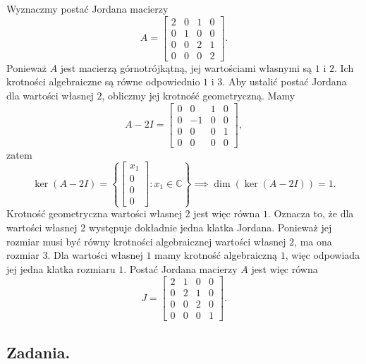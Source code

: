 \begin{example}
	Wyznaczmy postać Jordana macierzy
	\begin{equation}
		A = \left[\begin{matrix}
			2 & 0 & 1 & 0 \\
			0 & 1 & 0 & 0 \\
			0 & 0 & 2 & 1 \\
			0 & 0 & 0 & 2
		\end{matrix}\right].
	\end{equation}
	Ponieważ $A$ jest macierzą górnotrójkątną,
		jej wartościami własnymi są $1$ i $2$.
	Ich krotności algebraiczne są równe odpowiednio $1$ i $3$.
	Aby ustalić postać Jordana dla wartości własnej $2$,
		obliczmy jej krotność geometryczną.
	Mamy
	\begin{equation}
		A - 2I = \left[\begin{matrix}
			0 & 0 & 1 & 0 \\
			0 & -1 & 0 & 0 \\
			0 & 0 & 0 & 1 \\
			0 & 0 & 0 & 0
		\end{matrix}\right],
	\end{equation}
	zatem
	\begin{equation}
		\ker(A - 2I) = \left\{\left[\begin{matrix}
			x_1 \\
			0 \\
			0 \\
			0
		\end{matrix}\right] : x_1 \in \mathbb{C}\right\}
		\implies
		\dim(\ker(A - 2I)) = 1.
	\end{equation}
	Krotność geometryczna wartości własnej $2$ jest więc równa $1$.
	Oznacza to,
		że dla wartości własnej $2$ występuje dokładnie jedna klatka Jordana.
	Ponieważ jej rozmiar musi być równy krotności algebraicznej wartości własnej $2$,
		ma ona rozmiar $3$.
	Dla wartości własnej $1$ mamy krotność algebraiczną $1$,
		więc odpowiada jej jedna klatka rozmiaru $1$.
	Postać Jordana macierzy $A$ jest więc równa
	\begin{equation}
		J = \left[\begin{matrix}
			2 & 1 & 0 & 0 \\
			0 & 2 & 1 & 0 \\
			0 & 0 & 2 & 0 \\
			0 & 0 & 0 & 1
		\end{matrix}\right].
	\end{equation}
\end{example}

\subsection{Zadania.}
